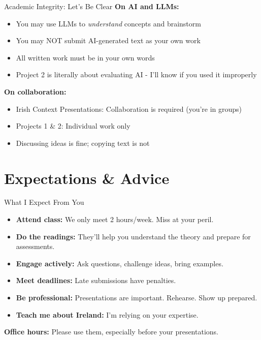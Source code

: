 \documentclass[10pt]{beamer}
\begin{document}
\begin{frame}{Academic Integrity: Let's Be Clear}
\textbf{On AI and LLMs:}
\begin{itemize}
\item You may use LLMs to \textit{understand} concepts and brainstorm
\item You may NOT submit AI-generated text as your own work
\item All written work must be in your own words
\item Project 2 is literally about evaluating AI - I'll know if you used it improperly
\end{itemize}


\textbf{On collaboration:}
\begin{itemize}
\item Irish Context Presentations: Collaboration is required (you're in groups)
\item Projects 1 \& 2: Individual work only
\item Discussing ideas is fine; copying text is not
\end{itemize}


\end{frame}

\section{Expectations \& Advice}

\begin{frame}{What I Expect From You}
\begin{itemize}
\item \textbf{Attend class:} We only meet 2 hours/week. Miss at your peril.
\item \textbf{Do the readings:} They'll help you understand the theory and prepare for assessments.
\item \textbf{Engage actively:} Ask questions, challenge ideas, bring examples.
\item \textbf{Meet deadlines:} Late submissions have penalties.
\item \textbf{Be professional:} Presentations are important. Rehearse. Show up prepared.
\item \textbf{Teach me about Ireland:} I'm relying on your expertise.
\end{itemize}


\textbf{Office hours:} Please use them, especially before your presentations.
\end{frame}
\end{document}
